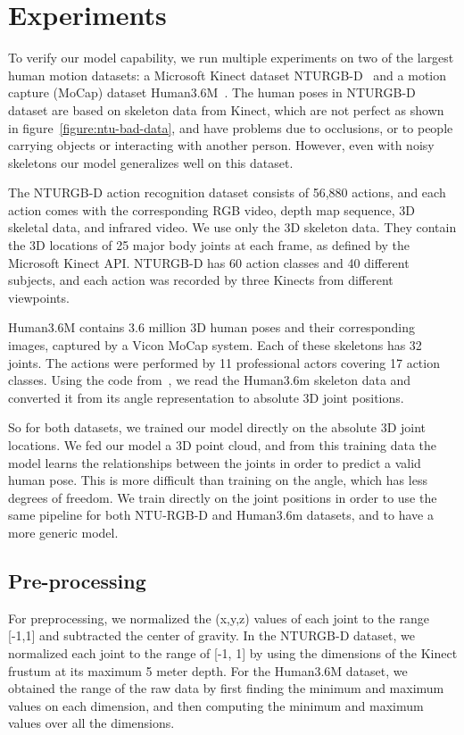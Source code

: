 \documentclass[10pt,twocolumn,letterpaper]{article}
\begin{document}
\section{Experiments}
To verify our model capability, we run multiple experiments on two of the largest human motion datasets: a Microsoft Kinect dataset NTURGB-D~\cite{cvpr2016:Shahroudy} and a motion capture (MoCap) dataset Human3.6M~\cite{pami2014:Ionescu,iccv2011:Ionescu}. The human poses in NTURGB-D dataset are based on skeleton data from Kinect, which are not perfect as shown in figure~\ref{figure:ntu-bad-data}, and have problems due to occlusions, or to people carrying objects or interacting with another person. However, even with noisy skeletons our model generalizes well on this dataset.

The NTURGB-D action recognition dataset consists of 56,880 actions, and each action comes with the corresponding RGB video, depth map sequence, 3D skeletal data, and infrared video. We use only the 3D skeleton data. They contain the 3D locations of 25 major body joints at each frame, as defined by the Microsoft Kinect API. NTURGB-D has 60 action classes and 40 different subjects, and each action was recorded by three Kinects from different viewpoints.

Human3.6M contains 3.6 million 3D human poses and their corresponding images, captured by a Vicon MoCap system. Each of these skeletons has 32 joints. The actions were performed by 11 professional actors covering 17 action classes. Using the code from~\cite{cvpr2017:julieta}, we read the Human3.6m skeleton data and converted it from its angle representation to absolute 3D joint positions.

So for both datasets, we trained our model directly on the absolute 3D joint locations. We fed our model a 3D point cloud, and from this training data the model learns the relationships between the joints in order to predict a valid human pose. This is more difficult than training on the angle, which has less degrees of freedom. We train directly on the joint positions in order to use the same pipeline for both NTU-RGB-D and Human3.6m datasets, and to have a more generic model.

\subsection{Pre-processing}

For preprocessing, we normalized the (x,y,z) values of each joint to the range [-1,1] and subtracted the center of gravity. In the NTURGB-D dataset, we normalized each joint to the range of [-1, 1] by using the dimensions of the Kinect frustum at its maximum 5 meter depth. For the Human3.6M dataset, we obtained the range of the raw data by first finding the minimum and maximum values on each dimension, and then computing the minimum and maximum values over all the dimensions.
\end{document}
